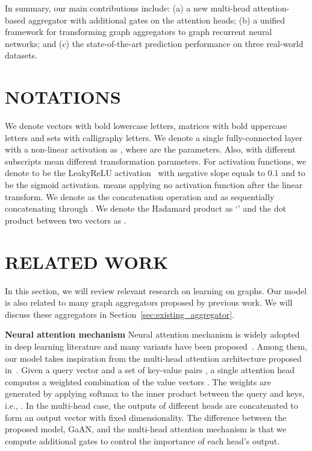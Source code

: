 \documentclass{article}
\begin{document}
	
	In summary, our main contributions include: (a) a new multi-head attention-based aggregator with additional gates on the attention heads; (b) a unified framework for transforming graph aggregators to graph recurrent neural networks; and (c) the state-of-the-art prediction performance on three real-world datasets. 
	
	
	\section{NOTATIONS}
	We denote vectors with bold lowercase letters, matrices with bold uppercase letters and sets with calligraphy letters. We denote a single fully-connected layer with a non-linear activation  as , where  are the parameters.
	Also,  with different subscripts mean different transformation parameters.
	For activation functions, we denote  to be the LeakyReLU activation~\citep{xu2015empirical} with negative slope equals to 0.1 and  to be the sigmoid activation.  means applying no activation function after the linear transform. We denote  as the concatenation operation and  as sequentially concatenating  through . We denote the Hadamard product as `' and the dot product between two vectors as . 
	
\section{RELATED WORK}
	In this section, we will review relevant research on learning on graphs. Our model is also related to many graph aggregators proposed by previous work. We will discuss these aggregators in Section~\ref{sec:existing_aggregator}.
	
	
	\textbf{Neural attention mechanism}\quad
	Neural attention mechanism is widely adopted in deep learning literature and many variants have been proposed~\citep{chorowski2014end, xu2015show, seo2016bidirectional, vaswani2017attention}. Among them, our model takes inspiration from the multi-head attention architecture proposed in~\citep{vaswani2017attention}. Given a query vector  and a set of key-value pairs , a single attention head computes a weighted combination of the value vectors . The weights are generated by applying softmax to the inner product between the query and keys, i.e., . In the multi-head case, the outputs of  different heads are concatenated to form an output vector with fixed dimensionality. The difference between the proposed model, GaAN, and the multi-head attention mechanism is that we compute additional gates to control the importance of each head's output.
\end{document}
